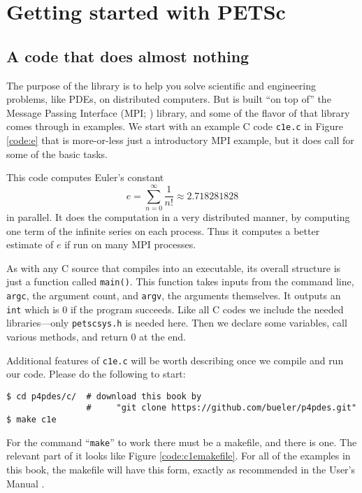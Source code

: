 
\chapter{Getting started with PETSc}
\label{chap:getstarted}

\section{A code that does almost nothing}

The purpose of the \PETSc library is to help you solve scientific and engineering problems, like PDEs, on distributed computers.  But \PETSc is built ``on top of'' the Message Passing Interface (MPI; \citep{Groppetal1999}) library, and some of the flavor of that library comes through in examples.  We start with an example C code \texttt{c1e.c} in Figure \ref{code:e} that is more-or-less just a introductory MPI example, but it does call \PETSc for some of the basic tasks.

This code computes Euler's constant
  $$e = \sum_{n = 0}^\infty \frac{1}{n!} \approx 2.718281828$$
in parallel.  It does the computation in a very distributed manner, by computing one term of the infinite series on each process.  Thus it computes a better estimate of $e$ if run on many MPI processes.

As with any C source that compiles into an executable, its overall structure is just a function called \texttt{main()}.  This function takes inputs from the command line, \texttt{argc}, the argument count, and \texttt{argv}, the arguments themselves.  It outputs an \texttt{int} which is $0$ if the program succeeds.  Like all C codes we include the needed libraries---only \texttt{petscsys.h} is needed here.  Then we declare some variables, call various methods, and return $0$ at the end.

Additional features of \texttt{c1e.c} will be worth describing once we compile and run our code.  Please do the following to start:
\begin{Verbatim}[fontsize=\small]
$ cd p4pdes/c/  # download this book by
                #     "git clone https://github.com/bueler/p4pdes.git"
$ make c1e
\end{Verbatim}
For the command ``\texttt{make}'' to work there must be a makefile, and there is one.  The relevant part of it looks like Figure \ref{code:c1emakefile}.  For all of the \PETSc examples in this book, the makefile will have this form, exactly as recommended in the \PETSc User's Manual \citep{petsc-user-ref}.

